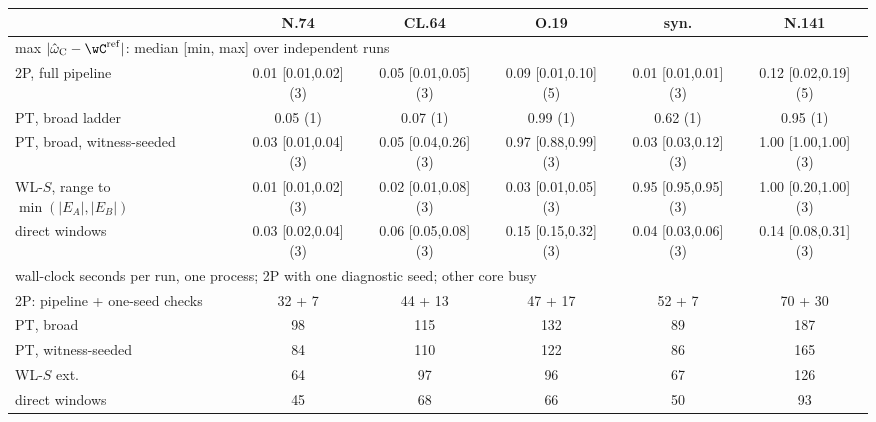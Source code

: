 \begin{tabular}{lccccc}
\toprule
 & N.74 & CL.64 & O.19 & syn. & N.141 \\
\midrule
\multicolumn{6}{l}{max $|\hat\omega_{\mathrm C}-\wC^{\rm ref}|$: median [min, max] over independent runs} \\
2P, full pipeline & 0.01 [0.01,0.02] (3) & 0.05 [0.01,0.05] (3) & 0.09 [0.01,0.10] (5) & 0.01 [0.01,0.01] (3) & 0.12 [0.02,0.19] (5) \\
PT, broad ladder & 0.05 (1) & 0.07 (1) & 0.99 (1) & 0.62 (1) & 0.95 (1) \\
PT, broad, witness-seeded & 0.03 [0.01,0.04] (3) & 0.05 [0.04,0.26] (3) & 0.97 [0.88,0.99] (3) & 0.03 [0.03,0.12] (3) & 1.00 [1.00,1.00] (3) \\
WL-$S$, range to $\min(|E_A|,|E_B|)$ & 0.01 [0.01,0.02] (3) & 0.02 [0.01,0.08] (3) & 0.03 [0.01,0.05] (3) & 0.95 [0.95,0.95] (3) & 1.00 [0.20,1.00] (3) \\
direct windows & 0.03 [0.02,0.04] (3) & 0.06 [0.05,0.08] (3) & 0.15 [0.15,0.32] (3) & 0.04 [0.03,0.06] (3) & 0.14 [0.08,0.31] (3) \\
\midrule
\multicolumn{6}{l}{wall-clock seconds per run, one process; 2P with one diagnostic seed; other core busy} \\
2P: pipeline + one-seed checks & 32 + 7 & 44 + 13 & 47 + 17 & 52 + 7 & 70 + 30 \\
PT, broad & 98 & 115 & 132 & 89 & 187 \\
PT, witness-seeded & 84 & 110 & 122 & 86 & 165 \\
WL-$S$ ext. & 64 & 97 & 96 & 67 & 126 \\
direct windows & 45 & 68 & 66 & 50 & 93 \\
\bottomrule
\end{tabular}
